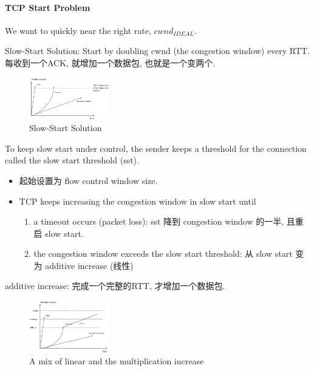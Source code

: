 \paragraph{TCP Start Problem}We want to quickly near the right rate, $cwnd_{IDEAL}$. 

Slow-Start Solution: Start by doubling cwnd (the congestion window) every RTT. 每收到一个ACK, 就增加一个数据包, 也就是一个变两个. 
\begin{figure}[!htb]
    \centering
    \includegraphics[width=0.309\textwidth]{pic/CN6/Slow-Start Solution}
    \caption{Slow-Start Solution}
\end{figure}

To keep slow start under control, the sender keeps a threshold for the connection called the slow start threshold (sst).
\begin{itemize}
    \item 起始设置为 flow control window size. 
    \item TCP keeps increasing the congestion window in slow start until
    \begin{enumerate}
        \item a timeout occurs (packet loss): sst 降到 congestion window 的一半, 且重启 slow start. 
        \item the congestion window exceeds the slow start threshold: 从 slow start 变为 additive increase (线性)
    \end{enumerate}
\end{itemize}

additive increase: 完成一个完整的RTT, 才增加一个数据包. 

\begin{figure}[!htb]
    \centering
    \includegraphics[width=0.309\textwidth]{pic/CN6/A mix of linear and the multiplication increase}
    \caption{A mix of linear and the multiplication increase}
\end{figure}

